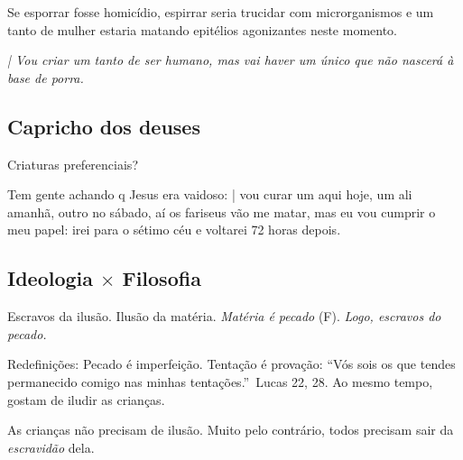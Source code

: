 \documentclass[12pt,a4paper]{article}
\begin{document}
				\begin{flushright}
				\end{flushright}

Se esporrar fosse homic\'idio, espirrar seria trucidar com microrganismos e
 um tanto de mulher estaria matando epit\'elios agonizantes neste momento.

				\begin{flushright}
				\end{flushright}

				\emph{| Vou criar um tanto de ser humano, mas vai haver um \'unico que n\~ao nascer\'a \`a base de porra.}

		\subsection {Capricho dos deuses}

			\begin{flushright}
			\end{flushright}

			Criaturas preferenciais?

			Tem gente achando q Jesus era vaidoso: | vou curar um aqui hoje, um ali amanh\~a, outro no s\'abado, a\'i os fariseus v\~ao me matar, mas eu vou cumprir o meu papel: irei para o s\'etimo c\'eu e voltarei 72 horas depois.

		\subsection{Ideologia $ \times $ Filosofia}\label{filos}
			\begin{flushright}
			\end{flushright}

			Escravos da ilus\~ao. Ilus\~ao da mat\'eria. \emph{Mat\'eria \'e pecado} (F). \emph{Logo, escravos do pecado.}

			Redefini\c{c}ões\cite{def}: Pecado \'e imperfei\c{c}\~ao. Tenta\c{c}\~ao \'e prova\c{c}\~ao\cite{bomCombate}: \textquotedblleft V\'os sois os que tendes permanecido comigo nas minhas tenta\c{c}ões.\textquotedblright\, Lucas 22, 28.
			Ao mesmo tempo, gostam de iludir as crian\c{c}as.

			\begin{flushright}
			\end{flushright}

			As crian\c{c}as n\~ao precisam de ilus\~ao. Muito pelo contr\'ario, todos precisam sair da \emph{escravid\~ao} dela.
\end{document}
